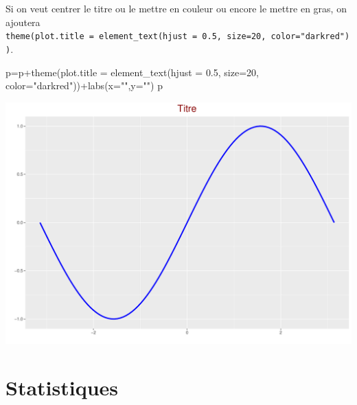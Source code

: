 \documentclass[
  8pt,
  ignorenonframetext,
]{beamer}
\newenvironment{Shaded}{\begin{snugshade}}{\end{snugshade}}
\newcommand{\AttributeTok}[1]{\textcolor[rgb]{0.77,0.63,0.00}{#1}}
\newcommand{\DecValTok}[1]{\textcolor[rgb]{0.00,0.00,0.81}{#1}}
\newcommand{\FloatTok}[1]{\textcolor[rgb]{0.00,0.00,0.81}{#1}}
\newcommand{\FunctionTok}[1]{\textcolor[rgb]{0.00,0.00,0.00}{#1}}
\newcommand{\NormalTok}[1]{#1}
\newcommand{\OtherTok}[1]{\textcolor[rgb]{0.56,0.35,0.01}{#1}}
\newcommand{\SpecialCharTok}[1]{\textcolor[rgb]{0.00,0.00,0.00}{#1}}
\newcommand{\StringTok}[1]{\textcolor[rgb]{0.31,0.60,0.02}{#1}}
\begin{document}
\begin{frame}[fragile]
Si on veut centrer le titre ou le mettre en couleur ou encore le mettre
en gras, on ajoutera
\texttt{theme(plot.title\ =\ element\_text(hjust\ =\ 0.5,\ size=20,\ color="darkred"))}.

\begin{Shaded}
\begin{Highlighting}[]
\NormalTok{p}\OtherTok{=}\NormalTok{p}\SpecialCharTok{+}\FunctionTok{theme}\NormalTok{(}\AttributeTok{plot.title =} \FunctionTok{element\_text}\NormalTok{(}\AttributeTok{hjust =} \FloatTok{0.5}\NormalTok{, }\AttributeTok{size=}\DecValTok{20}\NormalTok{,}
          \AttributeTok{color=}\StringTok{"darkred"}\NormalTok{))}\SpecialCharTok{+}\FunctionTok{labs}\NormalTok{(}\AttributeTok{x=}\StringTok{""}\NormalTok{,}\AttributeTok{y=}\StringTok{""}\NormalTok{)}
\NormalTok{p}
\end{Highlighting}
\end{Shaded}

\begin{center}\includegraphics[height=0.67\textheight]{Chap2_R_files/figure-beamer/unnamed-chunk-12-1} \end{center}
\end{frame}

\hypertarget{statistiques}{%
\section{Statistiques}\label{statistiques}}
\end{document}
